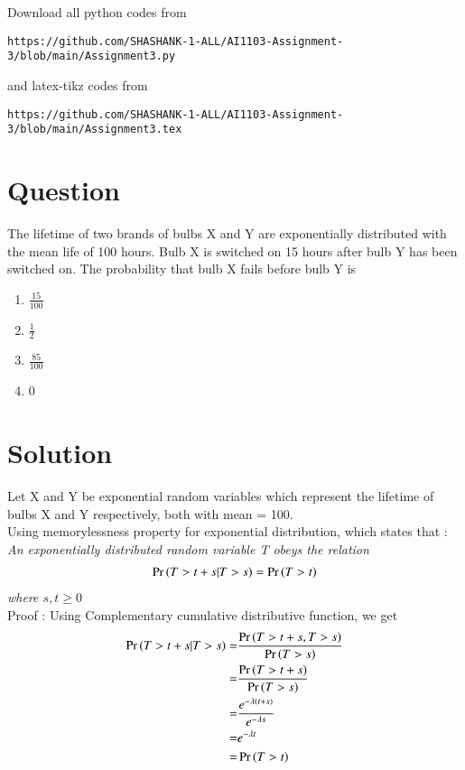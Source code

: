 \documentclass[journal,12pt,twocolumn]{IEEEtran}
\begin{document}
Download all python codes from \begin{lstlisting}
https://github.com/SHASHANK-1-ALL/AI1103-Assignment-3/blob/main/Assignment3.py
\end{lstlisting}
%
and latex-tikz codes from 
%
\begin{lstlisting}
https://github.com/SHASHANK-1-ALL/AI1103-Assignment-3/blob/main/Assignment3.tex
\end{lstlisting}
\section*{\textbf{Question}}
The lifetime of two brands of bulbs X and Y are exponentially distributed with the mean life of 100 hours. Bulb X is switched on 15 hours after bulb Y has been switched on. The probability that bulb X fails before bulb Y is 

\begin{enumerate}[label=(\Alph*)]
    \item $\frac{15}{100}$ \\
    \item $\frac{1}{2}$ \\
    \item $\frac{85}{100}$ \\
    \item 0 
  \end{enumerate}
  
\section*{\textbf{Solution}}
Let X and Y be exponential random variables which represent the lifetime of bulbs X and Y respectively, both with mean = 100.\\

Using memorylessness property for exponential distribution, which states that :\\
\emph{An exponentially distributed random variable T obeys the relation}
\begin{align}
  \Pr\left(T>t+s |T>s\right) = \Pr\left(T>t\right)
\end{align} 
\emph{where $s,t\geq 0$}\\

Proof : Using Complementary cumulative distributive function, we get
\begin{align}
   \Pr\left(T>t+s |T>s\right) =& \frac{\Pr\left(T>t+s , T>s\right)}{\Pr\left(T>s\right)} \\
   =& \frac{\Pr\left(T>t+s\right)}{\Pr\left(T>s\right)} \\
   =& \frac{e^{-\lambda(t+s)}}{e^{-\lambda s}}\\
   =&  e^{-\lambda t}\\
   =& \Pr\left(T>t\right)
\end{align}
\end{document}
